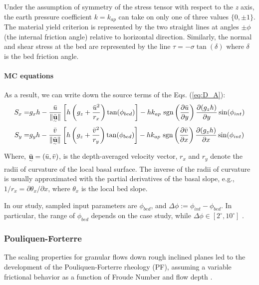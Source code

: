 \documentclass{article}
\begin{document}
Under the assumption of symmetry of the stress tensor with respect to the \textit{z} axis, the earth pressure coefficient $k=k_{ap}$ can take on only one of three values $\{ 0, \pm 1\}$. The material yield criterion is represented by the two straight lines at angles $\pm \phi$ (the internal friction angle) relative to horizontal direction. Similarly, the normal and shear stress at the bed are represented by the line $\tau=-\sigma \tan(\delta)$ where $\delta$ is the bed friction angle.

\paragraph{MC equations} As a result, we can write down the source terms of the Eqs. (\ref{eq:D_A}):
\begin{eqnarray}\label{S_terms_MC}
S_x =& g_x h  - \frac{\bar{u}}{\| \underset{^\sim}{\bar{\textbf u}} \|} \left[h\left(g_z+\frac{\bar{u}^2}{r_x}\right)\tan(\phi_{bed})\right] - h k_{ap} \ {\rm sgn}\left(\frac{\partial \bar{u}}{\partial y}\right) \frac{\partial (g_z h)}{\partial y} \sin(\phi_{int}) \nonumber \\
 S_y =& g_y h  - \frac{\bar{v}}{\| \underset{^\sim}{\bar{\textbf u}} \|} \left[h\left(g_z +\frac{\bar{v}^2}{r_y}\right)\tan(\phi_{bed})\right] - h k_{ap} \ {\rm sgn}\left({\frac{\partial \bar{v}}{\partial x}}\right) \frac{\partial (g_z h)}{\partial x} \sin(\phi_{int})
\end{eqnarray}
Where, $\underset{^\sim}{\bar{\textbf u}} = (\bar{u} , \bar{v})$, is the depth-averaged velocity vector, $r_x$ and $r_y$ denote the radii of curvature
of the local basal surface. The inverse of the radii of curvature is usually approximated with the partial derivatives of the basal slope, e.g., $1/r_x = \partial \theta_x/\partial x$, where $\theta_x$ is the local bed slope.

In our study, sampled input parameters are $\phi_{bed}$, and $\Delta \phi:=\phi_{int}-\phi_{bed}$. In particular, the range of $\phi_{bed}$ depends on the case study, while $\Delta \phi \in [2^{\mathrm{\circ}}, 10^{\mathrm{\circ}}]$ \citep{Dalbey2008}.

\subsubsection{Pouliquen-Forterre}\label{PFM}
The scaling properties for granular flows down rough inclined planes led to the development of the Pouliquen-Forterre rheology (PF), assuming a variable frictional behavior as a function of Froude Number and flow depth \citep{Pouliquen1999, ForterrePouliquen2002, PouliquenForterre2002, ForterrePouliquen2003}.
\end{document}
